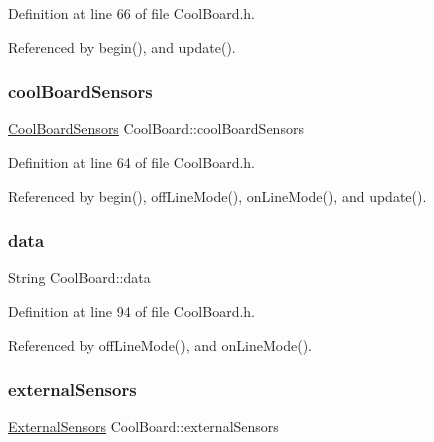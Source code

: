 Definition at line 66 of file Cool\+Board.\+h.



Referenced by begin(), and update().

\mbox{\label{classCoolBoard_af102be5288bd7f7a8e59b13f86e26a00}} 
\subsubsection{\texorpdfstring{cool\+Board\+Sensors}{coolBoardSensors}}
{\footnotesize\ttfamily \hyperlink{classCoolBoardSensors}{Cool\+Board\+Sensors} Cool\+Board\+::cool\+Board\+Sensors\hspace{0.3cm}{\ttfamily [private]}}



Definition at line 64 of file Cool\+Board.\+h.



Referenced by begin(), off\+Line\+Mode(), on\+Line\+Mode(), and update().

\mbox{\label{classCoolBoard_a427fb753dd8575bdf821c70a5c63d695}} 
\subsubsection{\texorpdfstring{data}{data}}
{\footnotesize\ttfamily String Cool\+Board\+::data\hspace{0.3cm}{\ttfamily [private]}}



Definition at line 94 of file Cool\+Board.\+h.



Referenced by off\+Line\+Mode(), and on\+Line\+Mode().

\mbox{\label{classCoolBoard_a09e26264839c65873eb56af476eff6b2}} 
\subsubsection{\texorpdfstring{external\+Sensors}{externalSensors}}
{\footnotesize\ttfamily \hyperlink{classExternalSensors}{External\+Sensors} Cool\+Board\+::external\+Sensors\hspace{0.3cm}{\ttfamily [private]}}



